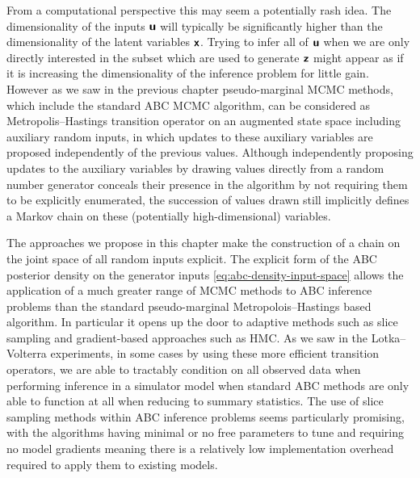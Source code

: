 From a computational perspective this may seem a potentially rash idea. The dimensionality of the inputs $\boldsymbol{\mathsf{u}}$ will typically be significantly higher than the dimensionality of the latent variables $\boldsymbol{\mathsf{x}}$. Trying to infer all of $\boldsymbol{\mathsf{u}}$ when we are only directly interested in the subset which are used to generate $\boldsymbol{\mathsf{z}}$ might appear as if it is increasing the dimensionality of the inference problem for little gain. However as we saw in the previous chapter pseudo-marginal \ac{MCMC} methods, which include the standard \ac{ABC} \ac{MCMC} algorithm, can be considered as Metropolis--Hastings transition operator on an augmented state space including auxiliary random inputs, in which updates to these auxiliary variables are proposed independently of the previous values. Although independently proposing updates to the auxiliary variables by drawing values directly from a random number generator conceals their presence in the algorithm by not requiring them to be explicitly enumerated, the succession of values drawn still implicitly defines a Markov chain on these (potentially high-dimensional) variables.

The approaches we propose in this chapter make the construction of a chain on the joint space of all random inputs explicit. The explicit form of the \ac{ABC} posterior density on the generator inputs \eqref{eq:abc-density-input-space} allows the application of a much greater range of \ac{MCMC} methods to \ac{ABC} inference problems than the standard pseudo-marginal Metropolois--Hastings based algorithm. In particular it opens up the door to adaptive methods such as slice sampling and gradient-based approaches such as \ac{HMC}. As we saw in the Lotka--Volterra experiments, in some cases by using these more efficient transition operators, we are able to tractably condition on all observed data when performing inference in a simulator model when standard \ac{ABC} methods are only able to function at all when reducing to summary statistics. The use of slice sampling methods within \ac{ABC} inference problems seems particularly promising, with the algorithms having minimal or no free parameters to tune and requiring no model gradients meaning there is a relatively low implementation overhead required to apply them to existing models. 

